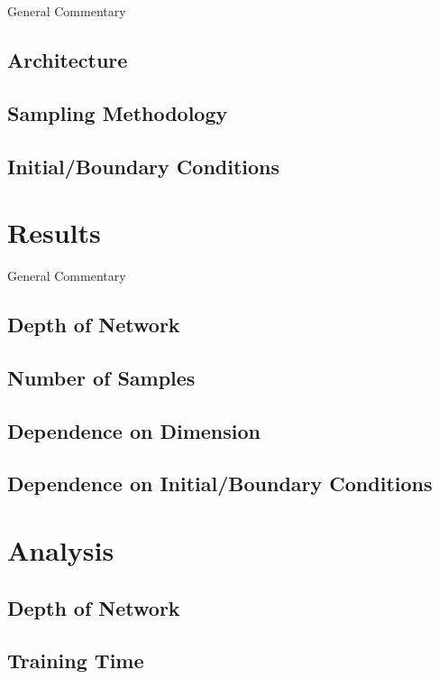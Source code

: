 \documentclass{article}
\begin{document}
General Commentary

\subsection{Architecture}

\subsection{Sampling Methodology}

\subsection{Initial/Boundary Conditions}

\section{Results}

General Commentary

\subsection{Depth of Network}

\subsection{Number of Samples}

\subsection{Dependence on Dimension}

\subsection{Dependence on Initial/Boundary Conditions}


\section{Analysis}

\subsection{Depth of Network}

\subsection{Training Time}
\end{document}
